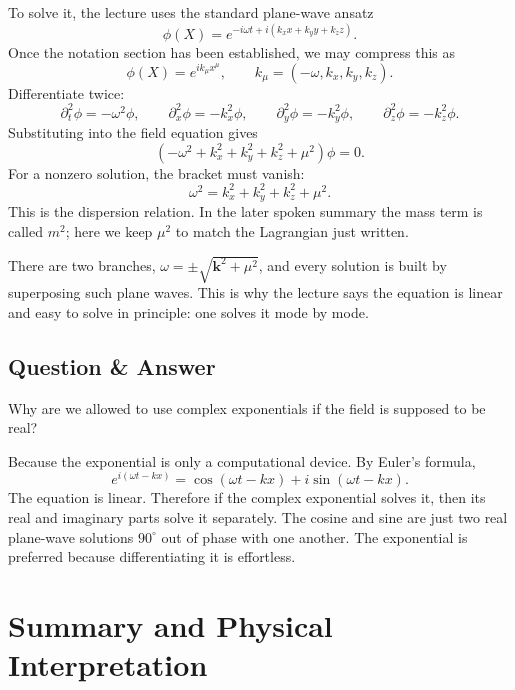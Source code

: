To solve it, the lecture uses the standard plane-wave ansatz
\begin{equation}
\phi(X)=e^{-i\omega t+i(k_xx+k_yy+k_zz)}.
\end{equation}
Once the notation section has been established, we may compress this as
\begin{equation}
\phi(X)=e^{ik_\mu x^\mu},
\qquad
k_\mu=(-\omega,k_x,k_y,k_z).
\end{equation}
Differentiate twice:
\begin{equation}
\partial_t^2\phi=-\omega^2\phi,
\qquad
\partial_x^2\phi=-k_x^2\phi,
\qquad
\partial_y^2\phi=-k_y^2\phi,
\qquad
\partial_z^2\phi=-k_z^2\phi.
\end{equation}
Substituting into the field equation gives
\begin{equation}
\left(-\omega^2+k_x^2+k_y^2+k_z^2+\mu^2\right)\phi=0.
\end{equation}
For a nonzero solution, the bracket must vanish:
\begin{equation}
\omega^2=k_x^2+k_y^2+k_z^2+\mu^2.
\end{equation}
This is the dispersion relation. In the later spoken summary the mass term is called \(m^2\); here we keep \(\mu^2\) to match the Lagrangian just written.

There are two branches, \(\omega=\pm\sqrt{\mathbf k^2+\mu^2}\), and every solution is built by superposing such plane waves. This is why the lecture says the equation is linear and easy to solve in principle: one solves it mode by mode.

\subsection{Question \& Answer}

Why are we allowed to use complex exponentials if the field is supposed to be real?

Because the exponential is only a computational device. By Euler's formula,
\begin{equation}
e^{i(\omega t-kx)}
=
\cos(\omega t-kx)
+
i\sin(\omega t-kx).
\end{equation}
The equation is linear. Therefore if the complex exponential solves it, then its real and imaginary parts solve it separately. The cosine and sine are just two real plane-wave solutions \(90^\circ\) out of phase with one another. The exponential is preferred because differentiating it is effortless.

\section{Summary and Physical Interpretation}

